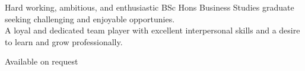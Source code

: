 \documentclass[a4paper]{limecv}
\begin{document}

\begin{cvSidebar}

  \begin{cvProfile}
    Hard working, ambitious, and enthusiastic BSc Hons Business Studies
    graduate seeking challenging and enjoyable opportunies.\\
    A loyal and dedicated team player with excellent interpersonal 
    skills and a desire to learn and grow professionally.
  \end{cvProfile}
  
  \begin{cvContact}
  \end{cvContact}

  \begin{cvReferencesSB}
    Available on request
  \end{cvReferencesSB}

\end{cvSidebar}
\end{document}
